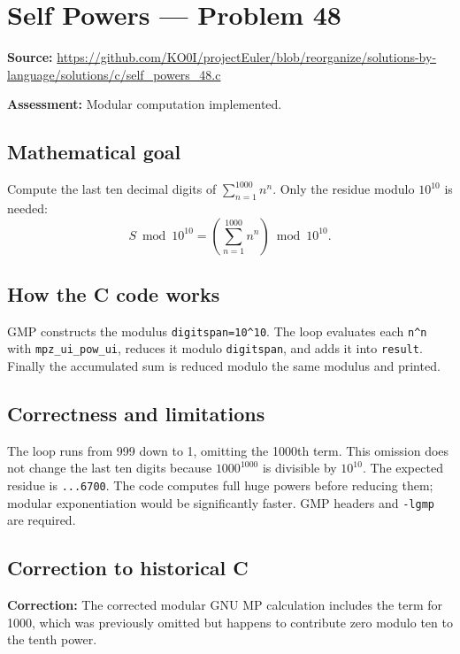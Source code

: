 \section{Self Powers --- Problem 48}
\label{prob:48}
\noindent\textbf{Source:} \url{https://github.com/KO0I/projectEuler/blob/reorganize/solutions-by-language/solutions/c/self_powers_48.c}

\noindent\textbf{Assessment:} Modular computation implemented.

\subsection*{Mathematical goal}
Compute the last ten decimal digits of \(\sum_{n=1}^{1000}n^n\). Only the residue modulo \(10^{10}\) is needed:
\[
S\bmod10^{10}=\left(\sum_{n=1}^{1000} n^n\right)\bmod10^{10}.
\]

\subsection*{How the C code works}
GMP constructs the modulus \verb|digitspan=10^10|. The loop evaluates each \verb|n^n| with \verb|mpz_ui_pow_ui|, reduces it modulo \verb|digitspan|, and adds it into \verb|result|. Finally the accumulated sum is reduced modulo the same modulus and printed.

\subsection*{Correctness and limitations}
The loop runs from 999 down to 1, omitting the 1000th term. This omission does not change the last ten digits because \(1000^{1000}\) is divisible by \(10^{10}\). The expected residue is \texttt{...6700}. The code computes full huge powers before reducing them; modular exponentiation would be significantly faster. GMP headers and \verb|-lgmp| are required.


\subsection*{Correction to historical C}
{\color{red}\textbf{Correction:} The corrected modular GNU MP calculation includes the term for 1000, which was previously omitted but happens to contribute zero modulo ten to the tenth power.}
